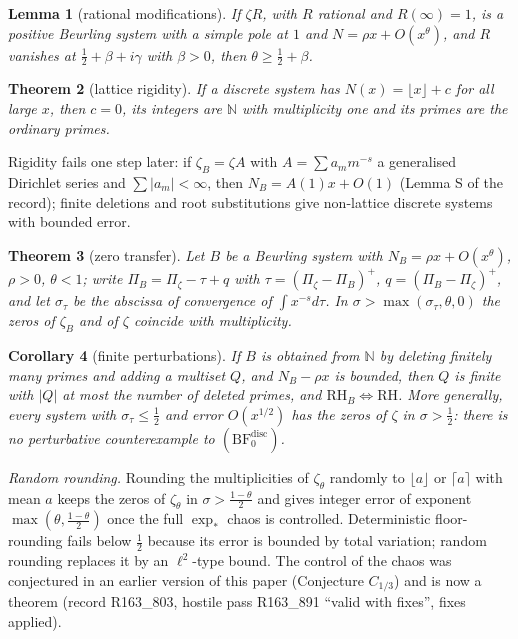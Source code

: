 \documentclass[11pt]{amsart}
\newtheorem{theorem}{Theorem}[section]
\newtheorem{lemma}[theorem]{Lemma}
\newtheorem{corollary}[theorem]{Corollary}
\theoremstyle{definition}
\theoremstyle{remark}
\newcommand{\N}{\mathbb N}
\begin{document}
\begin{lemma}[rational modifications]\label{lem:ratmod}
If $\zeta R$, with $R$ rational and $R(\infty)=1$, is a positive Beurling system with a simple pole at $1$ and
$N=\rho x+O(x^\theta)$, and $R$ vanishes at $\frac12+\beta+i\gamma$ with $\beta>0$, then $\theta\ge\frac12+\beta$.
\end{lemma}

\begin{theorem}[lattice rigidity]\label{thm:latticerig}
If a discrete system has $N(x)=\lfloor x\rfloor+c$ for all large $x$, then $c=0$, its integers are $\N$ with
multiplicity one and its primes are the ordinary primes.
\end{theorem}

\noindent Rigidity fails one step later: if $\zeta_B=\zeta A$ with $A=\sum a_mm^{-s}$ a generalised Dirichlet series and
$\sum|a_m|<\infty$, then $N_B=A(1)x+O(1)$ (Lemma S of the record); finite deletions and root substitutions give
non-lattice discrete systems with bounded error.

\begin{theorem}[zero transfer]\label{thm:zerotransfer}
Let $B$ be a Beurling system with $N_B=\rho x+O(x^\theta)$, $\rho>0$, $\theta<1$; write $\Pi_B=\Pi_\zeta-\tau+q$ with
$\tau=(\Pi_\zeta-\Pi_B)^+$, $q=(\Pi_B-\Pi_\zeta)^+$, and let $\sigma_\tau$ be the abscissa of convergence of
$\int x^{-s}d\tau$. In $\sigma>\max(\sigma_\tau,\theta,0)$ the zeros of $\zeta_B$ and of $\zeta$ coincide with multiplicity.
\end{theorem}

\begin{corollary}[finite perturbations]\label{cor:finitepert}
If $B$ is obtained from $\N$ by deleting finitely many primes and adding a multiset $Q$, and $N_B-\rho x$ is bounded,
then $Q$ is finite with $|Q|$ at most the number of deleted primes, and $\mathrm{RH}_B\iff\mathrm{RH}$. More generally,
every system with $\sigma_\tau\le\frac12$ and error $O(x^{1/2})$ has the zeros of $\zeta$ in $\sigma>\frac12$: there is no
perturbative counterexample to $(\mathrm{BF}^{\mathrm{disc}}_0)$.
\end{corollary}

\emph{Random rounding.} Rounding the multiplicities of $\zeta_\theta$ randomly to $\lfloor a\rfloor$ or
$\lceil a\rceil$ with mean $a$ keeps the zeros of $\zeta_\theta$ in $\sigma>\frac{1-\theta}2$ and gives integer error of
exponent $\max(\theta,\frac{1-\theta}2)$ once the full $\exp_*$ chaos is controlled. Deterministic floor-rounding
\cite[Thm.~6.3]{Broucke2024} fails below $\frac12$ because its error is bounded by total variation; random rounding
replaces it by an $\ell^2$-type bound. The control of the chaos was conjectured in an earlier version of this paper
(Conjecture $C_{1/3}$) and is now a theorem (record R163\_803, hostile pass R163\_891 ``valid with fixes'', fixes applied).
\end{document}
